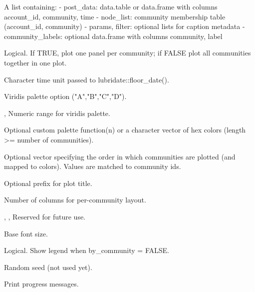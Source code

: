 \documentclass[a4paper]{book}
\begin{document}
\begin{Arguments}
\begin{ldescription}
\item[\code{network\_data}] A list containing:
- post\_data: data.table or data.frame with columns account\_id, community, time
- node\_list: community membership table (account\_id, community)
- params, filter: optional lists for caption metadata
- community\_labels: optional data.frame with columns community, label

\item[\code{by\_community}] Logical. If TRUE, plot one panel per community; if FALSE
plot all communities together in one plot.

\item[\code{unit}] Character time unit passed to lubridate::floor\_date().

\item[\code{palette\_option}] Viridis palette option ("A","B","C","D").

\item[\code{start\_color}, \code{end\_color}] Numeric range for viridis palette.

\item[\code{use\_palette}] Optional custom palette function(n) or a character vector
of hex colors (length >= number of communities).

\item[\code{use\_order}] Optional vector specifying the order in which communities
are plotted (and mapped to colors). Values are matched to community ids.

\item[\code{title\_prefix}] Optional prefix for plot title.

\item[\code{ncol}] Number of columns for per-community layout.

\item[\code{include\_examples}, \code{n\_examples}, \code{trunc}] Reserved for future use.

\item[\code{label\_fontsize}] Base font size.

\item[\code{legend}] Logical. Show legend when by\_community = FALSE.

\item[\code{seed}] Random seed (not used yet).

\item[\code{verbose}] Print progress messages.
\end{ldescription}
\end{Arguments}
\end{document}

